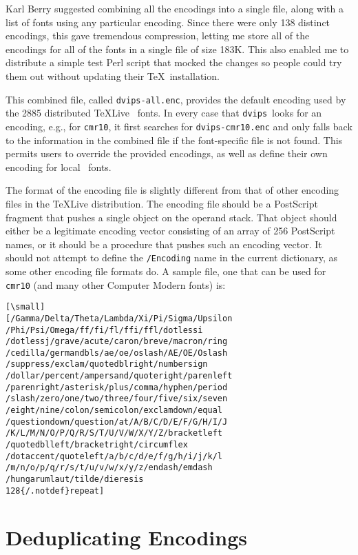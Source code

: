 \documentclass{ltugboat}
\def\dvips{\texttt{dvips}}
\begin{document}
Karl Berry suggested combining all the encodings into a single
file, along with a list of fonts using any particular encoding.
Since there were only 138 distinct encodings, this gave
tremendous compression, letting me store all of the encodings
for all of the fonts in a single file of size 183K.  This also
enabled me to distribute a simple test Perl script that mocked
the changes so people could try them out without updating their
\TeX\ installation.

This combined file, called \texttt{dvips-all.enc}, provides
the default encoding used by the 2885 distributed \TeX Live
\MF\ fonts.  In every case that \dvips\ looks for an encoding,
e.g., for \texttt{cmr10}, it first searches for \texttt{dvips-cmr10.enc}
and only falls back to the information in the combined file if
the font-specific file is not found.  This permits users to override
the provided encodings, as well as define their
own encoding for local \MF\ fonts.

The format of the encoding file is slightly different from that
of other encoding files in the \TeX Live distribution.  The
encoding file should be a PostScript fragment that pushes a
single object on the operand stack.  That object should either be a
legitimate encoding vector consisting of an array of 256
PostScript names, or it should be a procedure that pushes
such an encoding vector.  It should not attempt to define
the \texttt{/Encoding} name in the current dictionary, as some other
encoding file formats do.  A sample file, one that can be used
for \texttt{cmr10} (and many other Computer Modern fonts) is:

\begin{verbatim}[\small]
[/Gamma/Delta/Theta/Lambda/Xi/Pi/Sigma/Upsilon
/Phi/Psi/Omega/ff/fi/fl/ffi/ffl/dotlessi
/dotlessj/grave/acute/caron/breve/macron/ring
/cedilla/germandbls/ae/oe/oslash/AE/OE/Oslash
/suppress/exclam/quotedblright/numbersign
/dollar/percent/ampersand/quoteright/parenleft
/parenright/asterisk/plus/comma/hyphen/period
/slash/zero/one/two/three/four/five/six/seven
/eight/nine/colon/semicolon/exclamdown/equal
/questiondown/question/at/A/B/C/D/E/F/G/H/I/J
/K/L/M/N/O/P/Q/R/S/T/U/V/W/X/Y/Z/bracketleft
/quotedblleft/bracketright/circumflex
/dotaccent/quoteleft/a/b/c/d/e/f/g/h/i/j/k/l
/m/n/o/p/q/r/s/t/u/v/w/x/y/z/endash/emdash
/hungarumlaut/tilde/dieresis
128{/.notdef}repeat]
\end{verbatim}

\section{Deduplicating Encodings}
\end{document}
